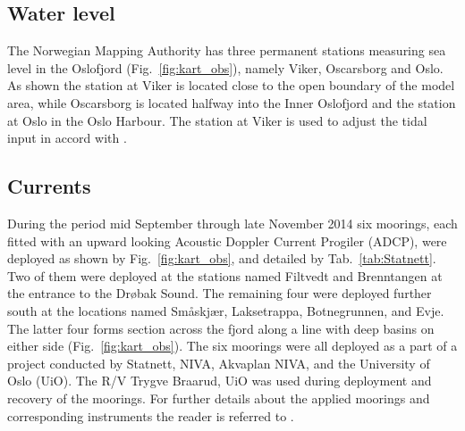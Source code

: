 
\subsection{Water level}
\label{subsec:wlevelo}
The Norwegian Mapping Authority has three permanent stations measuring sea level in the Oslofjord (Fig.~\ref{fig:kart_obs}), namely Viker, Oscarsborg and Oslo. As shown the station at Viker is located close to the open boundary of the model area, while Oscarsborg is located halfway into the Inner Oslofjord and the station at Oslo in the Oslo Harbour. The station at Viker is used to adjust the tidal input in accord with \cite{hjelm:etal:2017}.

\subsection{Currents}
\label{subsec:curreo}
During the period mid September through late November 2014 six moorings, each fitted with an upward looking Acoustic Doppler Current Progiler (ADCP), were deployed as shown by Fig.~\ref{fig:kart_obs}, and detailed by Tab.~\ref{tab:Statnett}. Two of them were deployed at the stations named Filtvedt and Brenntangen at the entrance to the Dr{\o}bak Sound. The remaining four were deployed further south at the locations named Sm{\aa}skj{\ae}r, Laksetrappa, Botnegrunnen, and Evje. The latter four forms section across the fjord along a line with deep basins on either side (Fig.~\ref{fig:kart_obs}). The six moorings were all deployed as a part of a project conducted by Statnett, NIVA, Akvaplan NIVA, and the University of Oslo (UiO). The R/V Trygve Braarud, UiO was used during deployment and recovery of the moorings. For further details about the applied moorings and corresponding instruments the reader is referred to \cite{staalstrom:2015}.


